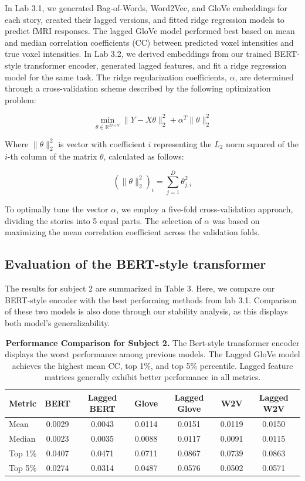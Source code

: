 \documentclass{article}
\begin{document}
In Lab 3.1, we generated Bag-of-Words, Word2Vec, and GloVe embeddings for each story, created their lagged versions, and fitted ridge regression models to predict fMRI responses. The lagged GloVe model performed best based on mean and median correlation coefficients (CC) between predicted voxel intensities and true voxel intensities. In Lab 3.2, we derived embeddings from our trained BERT-style transformer encoder, generated lagged features, and fit a ridge regression model for the same task. The ridge regularization coefficients, \(\alpha\), are determined through a cross-validation scheme described by the following optimization problem:

\[
\min_{\theta \in \mathbb{R}^{D \times V}} \|Y - X\theta\|_2^2 + \alpha^T\|\theta\|_2^2
\]

Where \( \| \theta \|_2^2 \) is vector with coefficient $i$ representing the \(L_2\) norm squared of the \(i\)-th column of the matrix \(\theta\), calculated as follows:

\[
(\| \theta \|_2^2)_i = \sum_{j=1}^D \theta_{j,i}^2
\]

To optimally tune the vector \(\alpha\), we employ a five-fold cross-validation approach, dividing the stories into 5 equal parts. The selection of \(\alpha\) was based on maximizing the mean correlation coefficient across the validation folds.

\subsection{Evaluation of the BERT-style transformer}

The results for subject 2 are summarized in Table 3. Here, we compare our BERT-style encoder with the best performing methods from lab 3.1. Comparison of these two models is also done through our stability analysis, as this displays both model's generalizability.

\begin{table}[H]
  \centering 
  \begin{tabular}{@{}lcccccc@{}} 
    \toprule
    Metric & \textbf{BERT} & \textbf{Lagged BERT} & \textbf{Glove} & \textbf{Lagged Glove} & \textbf{W2V} & \textbf{Lagged W2V} \\
    \midrule
    Mean     & 0.0029 & 0.0043 & 0.0114 & 0.0151 & 0.0119 & 0.0150 \\
    Median   & 0.0023 & 0.0035 & 0.0088 &  0.0117 & 0.0091 & 0.0115 \\
    Top 1\%  & 0.0407 & 0.0471 & 0.0711 & 0.0867 & 0.0739 & 0.0863  \\
    Top 5\%  & 0.0274 & 0.0314 & 0.0487 & 0.0576 & 0.0502 & 0.0571  \\
    \bottomrule
  \end{tabular}
  \caption{\textbf{Performance Comparison for Subject 2.} The Bert-style transformer encoder displays the worst performance among previous models. The Lagged GloVe model achieves the highest mean CC, top 1\%, and top 5\% percentile. Lagged feature matrices generally exhibit better performance in all metrics.}
  \label{tab:model_performance}
\end{table}
\end{document}
